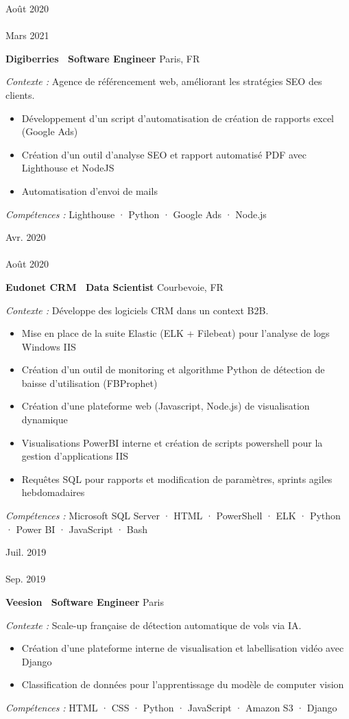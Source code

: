 \documentclass[10pt, a4paper]{article}
\newcommand{\firstcolwidth}{65pt}
\newcommand{\spaceaftersection}{0.8em}
\newcommand{\newsectionspace}{
    \begin{minipage}[t]{\linegoal}
        \hfill
        \vspace{\spaceaftersection}
    \end{minipage}
}
\newcommand{\experience}[6]{
    \begin{minipage}[t]{\firstcolwidth}
        \footnotesize{#1 \\ \textemdash \\ #2}
    \end{minipage}
    \begin{minipage}[t]{\linegoal}
        \textbf{\normalsize{#3 \textemdash\ #4}}
        \hfill
        \footnotesize{#5}
        \begin{singlespace}
            \begin{flushleft}
                \footnotesize{#6}
            \end{flushleft}
        \end{singlespace}
    \end{minipage}
}
\begin{document}
    \newsectionspace
    \experience{Août 2020}{Mars 2021}{Digiberries}{Software Engineer}{Paris, FR}{
        \textit{Contexte :} Agence de référencement web, améliorant les stratégies SEO des clients.
        \begin{itemize}[nosep, leftmargin=*]
            \item Développement d'un script d'automatisation de création de rapports excel (Google Ads)
            \item Création d'un outil d'analyse SEO et rapport automatisé PDF avec Lighthouse et NodeJS
            \item Automatisation d'envoi de mails
        \end{itemize}
        \textit{Compétences :} Lighthouse · Python · Google Ads · Node.js
    }

    \newsectionspace
    \experience{Avr. 2020}{Août 2020}{Eudonet CRM}{Data Scientist}{Courbevoie, FR}{
        \textit{Contexte :} Développe des logiciels CRM dans un context B2B.
        \begin{itemize}[nosep, leftmargin=*]
            \item Mise en place de la suite Elastic (ELK + Filebeat) pour l'analyse de logs Windows IIS
            \item Création d'un outil de monitoring et algorithme Python de détection de baisse d'utilisation (FBProphet)
            \item Création d'une plateforme web (Javascript, Node.js) de visualisation dynamique
            \item Visualisations PowerBI interne et création de scripts powershell pour la gestion d'applications IIS
            \item Requêtes SQL pour rapports et modification de paramètres, sprints agiles hebdomadaires
        \end{itemize}
        \textit{Compétences :} Microsoft SQL Server · HTML · PowerShell · ELK · Python · Power BI · JavaScript · Bash
    }

    \newsectionspace
    \experience{Juil. 2019}{Sep. 2019}{Veesion}{Software Engineer}{Paris}{
        \textit{Contexte :} Scale-up française de détection automatique de vols via IA.
        \begin{itemize}[nosep, leftmargin=*]
            \item Création d'une plateforme interne de visualisation et labellisation vidéo avec Django
            \item Classification de données pour l'apprentissage du modèle de computer vision
            \end{itemize}
        \textit{Compétences :} HTML · CSS · Python · JavaScript · Amazon S3 · Django
    }
\end{document}
